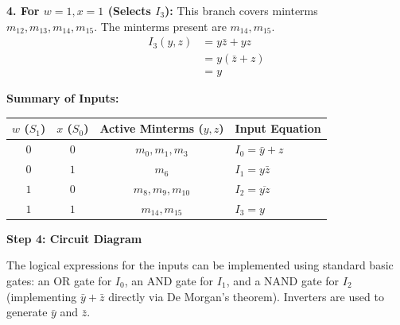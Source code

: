 \documentclass[12pt,a3paper]{article}
\begin{document}
\begin{enumerate}
\begin{tcolorbox}[enhanced,breakable,ansbox,colback=cD!4,colframe=cD,boxrule=0.8pt,arc=5pt,title={\textbf{Answer}},fonttitle=\bfseries\color{white},colbacktitle=cD]
\textbf{4. For $w=1, x=1$ (Selects $I_3$):}
This branch covers minterms $m_{12}, m_{13}, m_{14}, m_{15}$. The minterms present are $m_{14}, m_{15}$.
\begin{align*}
    I_3(y, z) &= y\bar{z} + yz \\
              &= y(\bar{z} + z) \\
              &= y
\end{align*}

\textbf{Summary of Inputs:}
\begin{center}
\renewcommand{\arraystretch}{1.2}
\begin{tabular}{cc|c|l}
\toprule
$w$ ($S_1$) & $x$ ($S_0$) & \textbf{Active Minterms ($y, z$)} & \textbf{Input Equation} \\
\midrule
$0$ & $0$ & $m_0, m_1, m_3$ & $I_0 = \bar{y} + z$ \\
$0$ & $1$ & $m_6$ & $I_1 = y\bar{z}$ \\
$1$ & $0$ & $m_8, m_9, m_{10}$ & $I_2 = \overline{yz}$ \\
$1$ & $1$ & $m_{14}, m_{15}$ & $I_3 = y$ \\
\bottomrule
\end{tabular}
\end{center}

\vspace{0.5cm}
\textbf{Step 4: Circuit Diagram}

The logical expressions for the inputs can be implemented using standard basic gates: an OR gate for $I_0$, an AND gate for $I_1$, and a NAND gate for $I_2$ (implementing $\bar{y} + \bar{z}$ directly via De Morgan's theorem). Inverters are used to generate $\bar{y}$ and $\bar{z}$.

\vspace{0.5cm}
\begin{center}
\end{center}
\end{tcolorbox}
\end{enumerate}
\end{document}
